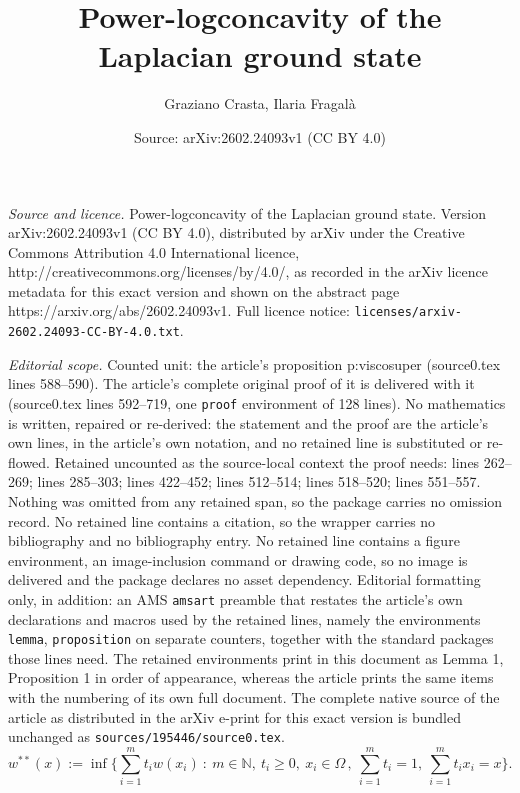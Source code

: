 \documentclass[10pt,a4paper]{amsart}
\title{Power-logconcavity of the Laplacian ground state}
\author{Graziano Crasta, Ilaria Fragal\`a}
\date{Source: arXiv:2602.24093v1 (CC BY 4.0)}
\def\N{\mathbb{N}}
\begin{document}
\maketitle

\noindent\emph{Source and licence.} Power-logconcavity of the Laplacian ground state. Version arXiv:2602.24093v1 (CC BY 4.0), distributed by arXiv under the Creative Commons Attribution 4.0 International licence, http://creativecommons.org/licenses/by/4.0/, as recorded in the arXiv licence metadata for this exact version and shown on the abstract page https://arxiv.org/abs/2602.24093v1. Full licence notice: \texttt{licenses/arxiv-2602.24093-CC-BY-4.0.txt}.\par\smallskip

\noindent\textit{Editorial scope.} Counted unit: the article's proposition p:viscosuper (source0.tex lines 588--590). The article's complete original proof of it is delivered with it (source0.tex lines 592--719, one \texttt{proof} environment of 128 lines). No mathematics is written, repaired or re-derived: the statement and the proof are the article's own lines, in the article's own notation, and no retained line is substituted or re-flowed.  Retained uncounted as the source-local context the proof needs: lines 262--269; lines 285--303; lines 422--452; lines 512--514; lines 518--520; lines 551--557.  Nothing was omitted from any retained span, so the package carries no omission record.  No retained line contains a citation, so the wrapper carries no bibliography and no bibliography entry.  No retained line contains a figure environment, an image-inclusion command or drawing code, so no image is delivered and the package declares no asset dependency.  Editorial formatting only, in addition: an AMS \texttt{amsart} preamble that restates the article's own declarations and macros used by the retained lines, namely the environments \texttt{lemma}, \texttt{proposition} on separate counters, together with the standard packages those lines need.  The retained environments print in this document as Lemma 1, Proposition 1 in order of appearance, whereas the article prints the same items with the numbering of its own full document.  The complete native source of the article as distributed in the arXiv e-print for this exact version is bundled unchanged as \texttt{sources/195446/source0.tex}.
 \begin{equation}\label{f:w**} 
w^{**} ( x):= 
\inf \Big \{ \sum_{ i = 1}^{m} t _i w(x_i) \ :\ 
m \in \N,\
t _ i\geq 0,\ x_i \in \Omega\,, \
\sum _{i = 1} ^ m t _ i = 1,\ 
\sum _{i = 1} ^ m t _ i x_i = x  \Big \}.
\end{equation}
\end{document}
